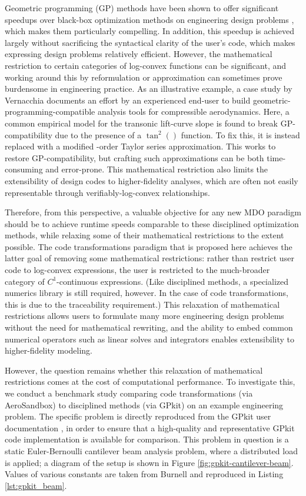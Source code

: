 Geometric programming (GP) methods have been shown to offer significant speedups over black-box optimization methods on engineering design problems \cite{kirschen}, which makes them particularly compelling. In addition, this speedup is achieved largely without sacrificing the syntactical clarity of the user's code, which makes expressing design problems relatively efficient. However, the mathematical restriction to certain categories of log-convex functions can be significant, and working around this by reformulation or approximation can sometimes prove burdensome in engineering practice. As an illustrative example, a case study by Vernacchia \cite{vernacchia_gpkit} documents an effort by an experienced end-user to build geometric-programming-compatible analysis tools for compressible aerodynamics. Here, a common empirical model for the transonic lift-curve slope is found to break GP-compatibility due to the presence of a $\tan^2()$ function. To fix this, it is instead replaced with a modified -order Taylor series approximation. This works to restore GP-compatibility, but crafting such approximations can be both time-consuming and error-prone. This mathematical restriction also limits the extensibility of design codes to higher-fidelity analyses, which are often not easily representable through verifiably-log-convex relationships.

Therefore, from this perspective, a valuable objective for any new MDO paradigm should be to achieve runtime speeds comparable to these disciplined optimization methods, while relaxing some of their mathematical restrictions to the extent possible. The code transformations paradigm that is proposed here achieves the latter goal of removing some mathematical restrictions: rather than restrict user code to log-convex expressions, the user is restricted to the much-broader category of $C^1$-continuous expressions. (Like disciplined methods, a specialized numerics library is still required, however. In the case of code transformations, this is due to the traceability requirement.) This relaxation of mathematical restrictions allows users to formulate many more engineering design problems without the need for mathematical rewriting, and the ability to embed common numerical operators such as linear solves and integrators enables extensibility to higher-fidelity modeling.

However, the question remains whether this relaxation of mathematical restrictions comes at the cost of computational performance. To investigate this, we conduct a benchmark study comparing code transformations (via AeroSandbox) to disciplined methods (via GPkit) on an example engineering problem. The specific problem is directly reproduced from the GPkit user documentation \cite{gpkit, gpkit_beam}, in order to ensure that a high-quality and representative GPkit code implementation is available for comparison. This problem in question is a static Euler-Bernoulli cantilever beam analysis problem, where a distributed load is applied; a diagram of the setup is shown in Figure \ref{fig:gpkit-cantilever-beam}. Values of various constants are taken from Burnell \cite{gpkit_beam} and reproduced in Listing \ref{lst:gpkit_beam}.

